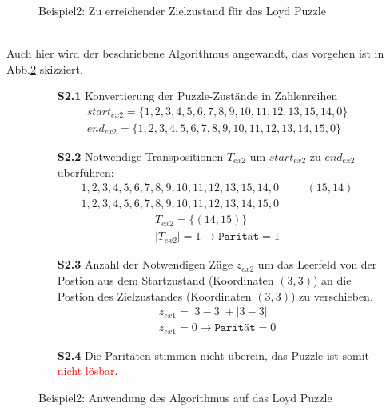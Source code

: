 \begin{minipage}{\linewidth}
\begin{minipage}[t]{0.45\linewidth}
\begin{figure}[H]
			\captionsetup{format=plain, indention=0pt}
			\caption{\label{fig:Ex2_end}Beispiel2: Zu erreichender Zielzustand für das Loyd Puzzle}
		\end{figure}
	\end{minipage}
\end{minipage}\\\WNL%
Auch hier wird der beschriebene Algorithmus angewandt, das vorgehen ist in Abb.\ref{fig:Ex2_algo} skizziert.
\begin{figure}[H]
	\begin{enumerate}
		\item[\textbf{S2.1}] Konvertierung der Puzzle-Zustände in Zahlenreihen
		      \begin{align*}
			      start_{ex2} = \{1,2,3,4,5,6,7,8,9,10,11,12,13,15,14,0\} \\
			      end_{ex2} = \{1,2,3,4,5,6,7,8,9,10,11,12,13,14,15,0\}
		      \end{align*}
		\item[\textbf{S2.2}] Notwendige Transpositionen $T_{ex2}$ um $start_{ex2}$ zu $end_{ex2}$ überführen:
		      \begin{align*}
			      1,2,3,4,5,6,7,8,9,10,11,12,13,15,14,0 & \hspace{20pt} (15,14) \\
			      1,2,3,4,5,6,7,8,9,10,11,12,13,14,15,0 &
		      \end{align*}
		      \begin{align*}
			      T_{ex2} = \{(14,15)\} \\
			      \left\vert T_{ex2}\right\vert = 1 \rightarrow \texttt{Parität} = 1
		      \end{align*}
		\item[\textbf{S2.3}] Anzahl der Notwendigen Züge $z_{ex2}$ um das Leerfeld von der Postion aus dem Startzustand (Koordinaten $(3,3)$) an die Postion des Zielzustandes (Koordinaten $(3,3)$) zu verschieben.
		      \begin{align*}
			      z_{ex1} = \left | 3 - 3 \right | + \left | 3 - 3 \right | \\
			      z_{ex1} = 0 \rightarrow \texttt{Parität} = 0
		      \end{align*}
		\item[\textbf{S2.4}] Die Paritäten stimmen nicht überein, das Puzzle ist somit \textcolor{red}{nicht lösbar}.
	\end{enumerate}
	\caption{Beispiel2: Anwendung des Algorithmus auf das Loyd Puzzle \label{fig:Ex2_algo}}
\end{figure}

